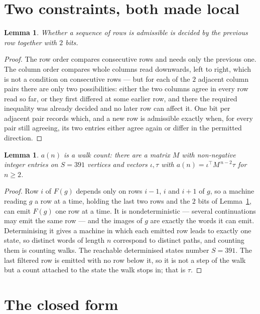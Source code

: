 \documentclass[11pt,a4paper]{article}
\theoremstyle{plain}
\newtheorem{lemma}[theorem]{Lemma}
\theoremstyle{definition}
\begin{document}
\section{Two constraints, both made local}

\begin{lemma}\label{lem:local}
Whether a sequence of rows is admissible is decided by the previous row together with
$2$ bits.
\end{lemma}

\begin{proof}
The row order compares consecutive rows and needs only the previous one. The column order
compares whole columns read downwards, left to right, which is not a condition on consecutive
rows --- but for each of the $2$ adjacent column pairs there are only two possibilities:
either the two columns agree in every row read so far, or they first differed at some earlier
row, and there the required inequality was already decided and no later row can affect it. One
bit per adjacent pair records which, and a new row is admissible exactly when, for every pair
still agreeing, its two entries either agree again or differ in the permitted direction.
\end{proof}

\begin{lemma}\label{lem:det}
$a(n)$ is a walk count: there are a matrix $M$ with non-negative integer entries on $S=391$
vertices and vectors $\iota,\tau$ with $a(n)=\iota^{\!\top}M^{\,n-2}\tau$ for $n\ge2$.
\end{lemma}

\begin{proof}
Row $i$ of $F(g)$ depends only on rows $i-1$, $i$ and $i+1$ of $g$, so a machine reading $g$ a
row at a time, holding the last two rows and the $2$ bits of Lemma~\ref{lem:local}, can
emit $F(g)$ one row at a time. It is nondeterministic --- several continuations may emit the
same row --- and the images of $g$ are exactly the words it can emit. Determinising it gives a
machine in which each emitted row leads to exactly one state, so distinct words of length $n$
correspond to distinct paths, and counting them is counting walks. The reachable determinised
states number $S=391$. The last filtered row is emitted with no row below it, so it is not a
step of the walk but a count attached to the state the walk stops in; that is $\tau$.
\end{proof}

\section{The closed form}
\end{document}
